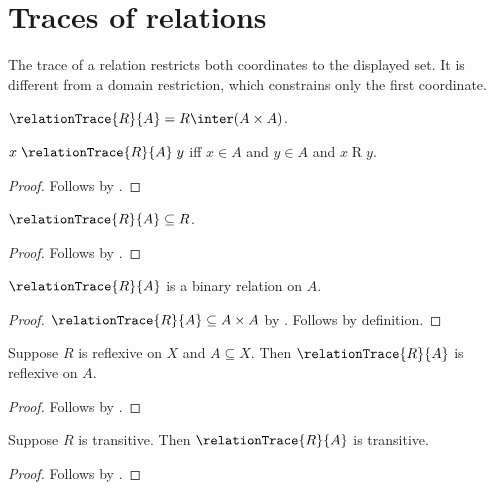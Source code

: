 \section{Traces of relations}



The trace of a relation restricts both coordinates to the displayed set.  It
is different from a domain restriction, which constrains only the first
coordinate.

\begin{definition}\label{relation_trace}
    $\relationTrace{R}{A}=R\inter(A\times A)$.
\end{definition}

\begin{proposition}\label{relation_trace_iff}
    $x\mathrel{\relationTrace{R}{A}}y$ iff
        $x\in A$ and $y\in A$ and $x\mathrel{R}y$.
\end{proposition}
\begin{proof}
    Follows by
        .
\end{proof}

\begin{proposition}\label{relation_trace_subseteq}
    $\relationTrace{R}{A}\subseteq R$.
\end{proposition}
\begin{proof}
    Follows by .
\end{proof}

\begin{classification}\label{relation_trace_binary_on}
    $\relationTrace{R}{A}$ is a binary relation on $A$.
\end{classification}
\begin{proof}
    $\relationTrace{R}{A}\subseteq A\times A$ by
        .
    Follows by definition.
\end{proof}

\begin{proposition}\label{relation_trace_reflexive_on}
    Suppose $R$ is reflexive on $X$ and $A\subseteq X$.
    Then $\relationTrace{R}{A}$ is reflexive on $A$.
\end{proposition}
\begin{proof}
    Follows by
        .
\end{proof}

\begin{proposition}\label{relation_trace_transitive}
    Suppose $R$ is transitive.
    Then $\relationTrace{R}{A}$ is transitive.
\end{proposition}
\begin{proof}
    Follows by .
\end{proof}

